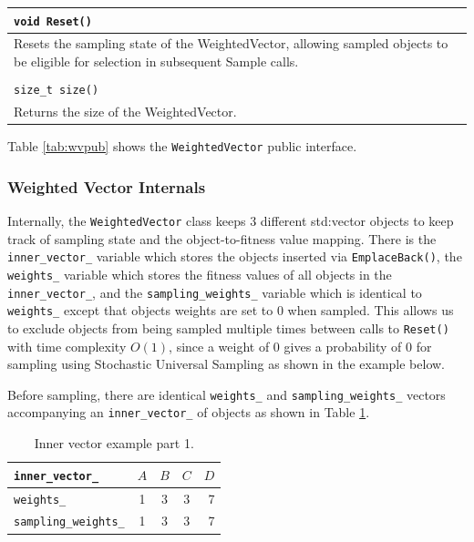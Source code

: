 \documentclass[12pt]{article}
\begin{document}
\begin{table}[htbp]
\begin{tabular}{ | p{1.0\linewidth} | }
      \\ \hline

      \verb|void Reset()|\\ \hline

      Resets the sampling state of the WeightedVector, allowing sampled objects
      to be eligible for selection in subsequent Sample calls.\\ \hline

      \\ \hline

      \verb|size_t size()|\\ \hline

      Returns the size of the WeightedVector.\\ \hline
    \end{tabular}
  \end{table}

  Table \ref{tab:wvpub} shows the \texttt{WeightedVector} public interface.

  \FloatBarrier

    \subsubsection{Weighted Vector Internals}

    Internally, the \texttt{WeightedVector} class keeps 3 different std:vector
    objects to keep track of sampling state and the object-to-fitness value
    mapping.  There is the \texttt{inner\_vector\_} variable which stores the
    objects inserted via \texttt{EmplaceBack()}, the \texttt{weights\_}
    variable which stores the fitness values of all objects in the
    \texttt{inner\_vector\_}, and the \texttt{sampling\_weights\_} variable
    which is identical to \texttt{weights\_} except that objects weights are
    set to 0 when sampled. This allows us to exclude objects from being sampled
    multiple times between calls to \texttt{Reset()} with time complexity
    $O(1)$, since a weight of 0 gives a probability of 0 for sampling using
    Stochastic Universal Sampling as shown in the example below.

    Before sampling, there are identical \texttt{weights\_} and
    \texttt{sampling\_weights\_} vectors accompanying an
    \texttt{inner\_vector\_} of objects as shown in Table
    \ref{tbl:inner-vec-1}.

    \begin{table}[htbp]
      \caption{Inner vector example part 1.}
      \label{tbl:inner-vec-1}
      \begin{center}
      \begin{tabular}{ | l | c | c | c | r | }
        \hline
        \verb|inner_vector_| & $A$ & $B$ & $C$ & $D$ \\ \hline
        \verb|weights_| & 1 & 3 & 3 & 7 \\ \hline
        \verb|sampling_weights_| & 1 & 3 & 3 & 7 \\ \hline
        \hline
      \end{tabular}
      \end{center}
    \end{table}
\end{document}
